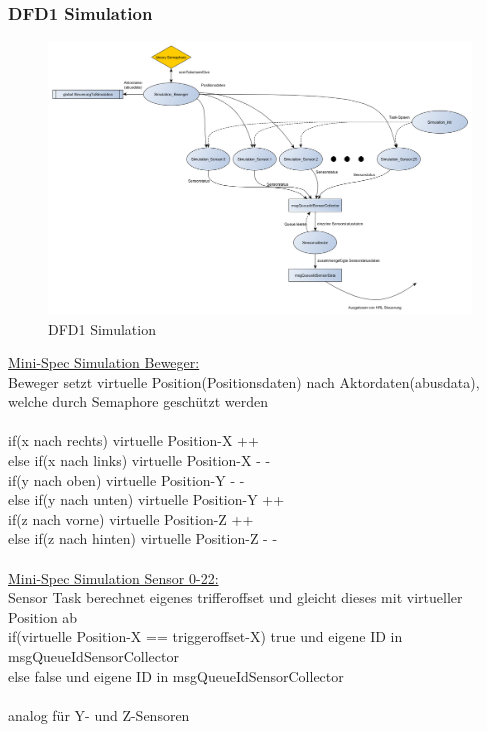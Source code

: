 \subsubsection{DFD1 Simulation}
\begin{figure}[H]
	\centering
  \includegraphics[width=\textwidth]{DFD/dfd1_simulation1_1.png}
	\caption{DFD1 Simulation}
	\label{fig2}
\end{figure}
\underline{Mini-Spec Simulation Beweger:}\\
Beweger setzt virtuelle Position(Positionsdaten) nach Aktordaten(abusdata), welche durch Semaphore geschützt werden\\ \\
 if(x nach rechts) virtuelle Position-X ++\\
else if(x nach links) virtuelle Position-X - -\\
if(y nach oben) virtuelle Position-Y - -\\
else if(y nach unten) virtuelle Position-Y ++\\
if(z nach vorne) virtuelle Position-Z ++\\
else if(z nach hinten) virtuelle Position-Z - -\\ \\

\underline{Mini-Spec Simulation Sensor 0-22:}\\
Sensor Task berechnet eigenes trifferoffset und gleicht dieses mit virtueller Position ab\\
if(virtuelle Position-X == triggeroffset-X) true und eigene ID in msgQueueIdSensorCollector\\
else false und eigene ID in msgQueueIdSensorCollector\\ \\
analog für Y- und Z-Sensoren\\ \\

